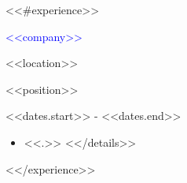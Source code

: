 \documentclass[draft=on, 10pt]{scrbook}
\begin{document}
%
%

<<#experience>>
\begin{minipage}[t]{1\textwidth}

    \begin{minipage}[t]{.3\textwidth}
    
    {\Large \textcolor{blue}{<<company>>}}
    
    <<location>>
    
    \end{minipage}
    \begin{minipage}[t]{.3\textwidth}
    
    {\Large <<position>>}
    
    <<dates.start>> - <<dates.end>>
    
    \end{minipage}
    \begin{minipage}[t]{.35\textwidth}
    
    \begin{itemize}
        <<#details>>
            \item <<.>>
        <</details>>
    \end{itemize}
    
    \end{minipage}

\end{minipage}


<</experience>>
\end{document}
